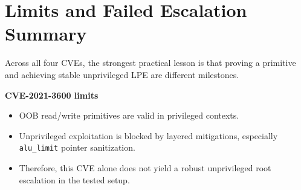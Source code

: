 



\section{Limits and Failed Escalation Summary}

Across all four CVEs, the strongest practical lesson is that proving a primitive and achieving stable unprivileged LPE are different milestones.

\textbf{CVE-2021-3600 limits}
\begin{itemize}
	\item OOB read/write primitives are valid in privileged contexts.
	\item Unprivileged exploitation is blocked by layered mitigations, especially \texttt{alu\_limit} pointer sanitization.
	\item Therefore, this CVE alone does not yield a robust unprivileged root escalation in the tested setup.
\end{itemize}

